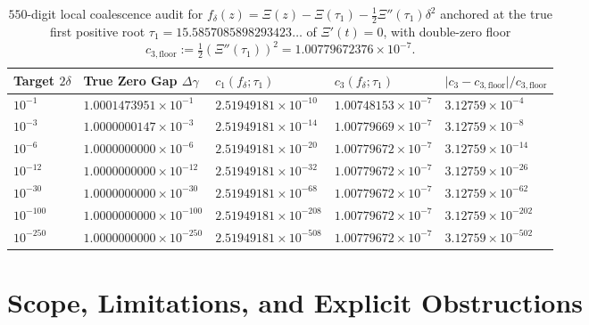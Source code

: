 \documentclass[11pt,reqno]{amsart}
\theoremstyle{definition}
\theoremstyle{remark}
\numberwithin{equation}{section}
\begin{document}
\begin{table}[htbp]
  \centering
  \caption{$550$-digit local coalescence audit for $f_\delta(z) = \Xi(z) - \Xi(\tau_1) - \frac{1}{2}\Xi''(\tau_1)\delta^2$ anchored at the true first positive root $\tau_1 = 15.5857085898293423\dots$ of $\Xi'(t)=0$, with double-zero floor $c_{3,\mathrm{floor}} := \frac{1}{2}(\Xi''(\tau_1))^2 = 1.00779672376 \times 10^{-7}$.}
  \label{tab:coalescence_550}
  \renewcommand{\arraystretch}{1.15}
  \begin{tabular}{@{}lllll@{}}
    \toprule
    Target $2\delta$ & True Zero Gap $\Delta\gamma$ & $c_1(f_\delta; \tau_1)$ & $c_3(f_\delta; \tau_1)$ & $\lvert c_3 - c_{3,\mathrm{floor}}\rvert / c_{3,\mathrm{floor}}$ \\
    \midrule
    $10^{-1}$   & $1.0001473951 \times 10^{-1}$ & $2.51949181 \times 10^{-10}$  & $1.00748153 \times 10^{-7}$ & $3.12759 \times 10^{-4}$ \\
    $10^{-3}$   & $1.0000000147 \times 10^{-3}$ & $2.51949181 \times 10^{-14}$  & $1.00779669 \times 10^{-7}$ & $3.12759 \times 10^{-8}$ \\
    $10^{-6}$   & $1.0000000000 \times 10^{-6}$ & $2.51949181 \times 10^{-20}$  & $1.00779672 \times 10^{-7}$ & $3.12759 \times 10^{-14}$ \\
    $10^{-12}$  & $1.0000000000 \times 10^{-12}$ & $2.51949181 \times 10^{-32}$ & $1.00779672 \times 10^{-7}$ & $3.12759 \times 10^{-26}$ \\
    $10^{-30}$  & $1.0000000000 \times 10^{-30}$ & $2.51949181 \times 10^{-68}$ & $1.00779672 \times 10^{-7}$ & $3.12759 \times 10^{-62}$ \\
    $10^{-100}$ & $1.0000000000 \times 10^{-100}$ & $2.51949181 \times 10^{-208}$ & $1.00779672 \times 10^{-7}$ & $3.12759 \times 10^{-202}$ \\
    $10^{-250}$ & $1.0000000000 \times 10^{-250}$ & $2.51949181 \times 10^{-508}$ & $1.00779672 \times 10^{-7}$ & $3.12759 \times 10^{-502}$ \\
    \bottomrule
  \end{tabular}
\end{table}

\section{Scope, Limitations, and Explicit Obstructions}\label{sec:obstructions}
\end{document}
